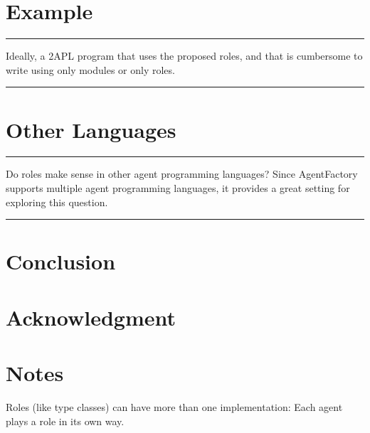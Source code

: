 \documentclass[conference,compsoc]{IEEEtran}
\newenvironment{notes}{\medskip\hrule\nobreak\smallskip\narrower}{\smallskip\hrule\medskip}
\begin{document}
\section{Example}

\begin{notes}
Ideally, a 2APL program that uses the proposed roles, and that is 
cumbersome to write using only modules or only roles.
\end{notes}

\section{Other Languages}

\begin{notes}
Do roles make sense in other agent programming languages? Since AgentFactory
supports multiple agent programming languages, it provides a great setting
for exploring this question.
\end{notes}

\section{Conclusion}

\section*{Acknowledgment}




\section*{Notes}

Roles (like type classes) can have more than one implementation: Each agent
plays a role in its own way.
\end{document}
